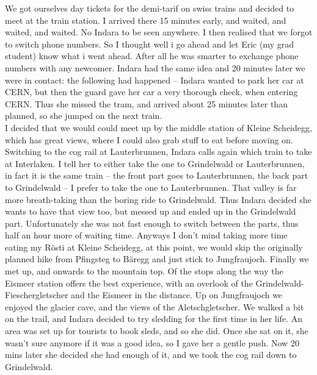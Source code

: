  We got ourselves day tickets for the demi-tarif on swiss trains and decided to meet at the train station. I arrived there 15 minutes early, and waited, and waited, and waited. No Indara to be seen anywhere. I then realised that we forgot to switch phone numbers. So I thought well i go ahead and let Eric (my grad student) know what i went ahead. After all he was smarter to exchange phone numbers with any newcomer. Indara had the same idea and 20 minutes later we were in contact: the following had happened -- Indara wanted to park her car at CERN, but then the guard gave her car a very thorough check, when entering CERN. Thus she missed the tram, and arrived about 25 minutes later than planned, so she jumped on the next train.\\
 I decided that we would could meet up by the middle station of Kleine Scheidegg, which has great views, where I could also grab stuff to eat before moving on. Switching to the cog rail at Lauterbrunnen, Indara calls again which train to take at Interlaken. I tell her to either take the one to Grindelwald or Lauterbrunnen, in fact it is the same train -- the front part goes to Lauterbrunnen, the back part to Grindelwald -- I prefer to take the one to Lauterbrunnen. That valley is far more breath-taking than the boring ride to Grindelwald. Thus Indara decided she wants to have that view too, but messed up and ended up in the Grindelwald part. Unfortunately she was not fast enough to switch between the parts, thus half an hour more of waiting time. Anyways I don't mind taking more time eating my R\"osti at Kleine Scheidegg, at this point, we would skip the originally planned hike from Pfingsteg to B\"aregg and just stick to Jungfraujoch. Finally we met up, and onwards to the mountain top. Of the stops along the way the Eismeer station offers the best experience, with an overlook of the Grindelwald-Fieschergletscher and the Eismeer in the distance. Up on Jungfraujoch we enjoyed the glacier cave, and the views of the Aletschgletscher. We walked a bit on the trail, and Indara decided to try sledding for the first time in her life. An area was set up for tourists to book sleds, and so she did. Once she sat on it, she wasn't sure anymore if it was a good idea, so I gave her a gentle push. Now 20 mins later she decided she had enough of it, and we took the cog rail down to Grindelwald. \\
